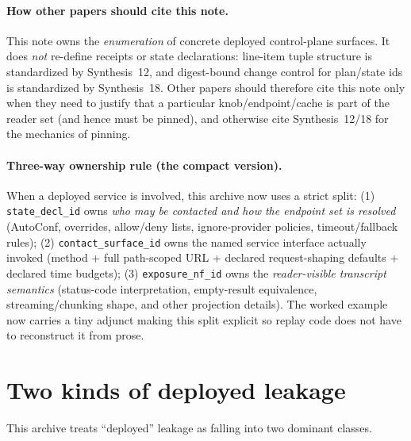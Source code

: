 \documentclass[11pt]{article}
\begin{document}
\paragraph{How other papers should cite this note.}
This note owns the \emph{enumeration} of concrete deployed control-plane surfaces.
It does \emph{not} re-define receipts or state declarations: line-item tuple structure is standardized by Synthesis~12, and digest-bound change control for plan/state ids is standardized by Synthesis~18.\cite{series:receiptitems,series:planstateequiv}
Other papers should therefore cite this note only when they need to justify that a particular knob/end\-point/cache is part of the reader set (and hence must be pinned), and otherwise cite Synthesis~12/18 for the mechanics of pinning.

\paragraph{Three-way ownership rule (the compact version).}
When a deployed service is involved, this archive now uses a strict split:
(1) \texttt{state\_decl\_id} owns \emph{who may be contacted and how the endpoint set is resolved} (AutoConf, overrides, allow/deny lists, ignore-provider policies, timeout/fallback rules);
(2) \texttt{contact\_surface\_id} owns the named service interface actually invoked (method + full path-scoped URL + declared request-shaping defaults + declared time budgets);
(3) \texttt{exposure\_nf\_id} owns the \emph{reader-visible transcript semantics} (status-code interpretation, empty-result equivalence, streaming/chunking shape, and other projection details).
The worked example now carries a tiny adjunct making this split explicit so replay code does not have to reconstruct it from prose.

\section{Two kinds of deployed leakage}
This archive treats ``deployed'' leakage as falling into two dominant classes.
\end{document}
